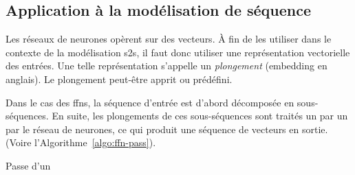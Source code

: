 \subsection{Application à la modélisation de séquence}

Les réseaux de neurones opèrent sur des vecteurs.
À fin de les utiliser dans le contexte de la modélisation \gls{s2s}, 
il faut donc utiliser une représentation vectorielle des entrées.
Une telle représentation s'appelle un \emph{plongement} (\foreignlanguage{english}{embedding} en anglais).
Le plongement peut-être apprit ou prédéfini.

Dans le cas des \glspl{ffn}, la séquence d'entrée est d'abord décomposée en sous-séquences.
En suite, les plongements de ces sous-séquences sont traités un par un par le réseau de neurones,
ce qui produit une séquence de vecteurs en sortie.
(Voire l'Algorithme~\ref{algo:ffn-pass}).

\begin{algorithm}[htb]
    \caption{Passe d'un }
    \label{algo:ffn-pass}
\end{algorithm}
